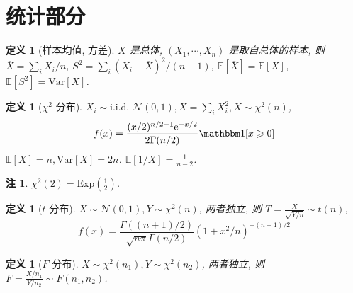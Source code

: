 \documentclass[8pt]{article}
\theoremstyle{compact}
\newtheorem{definition}[theorem]{定义}
\newtheorem{remark}[theorem]{注}
\def\ge{\geqslant}
\def\e{\mathrm{e}}
\def\E#1{\mathbb{E}\left[{#1}\right]}
\def\Var#1{\text{Var}\left[{#1}\right]}
\begin{document}
\section{统计部分}
\begin{definition}[样本均值, 方差]
	$X$ 是总体, $(X_1, \cdots, X_n)$ 是取自总体的样本, 则 $\overline{X} = \sum_i X_i / n$, $S^2 = \sum_i (X_i - \overline{X})^2 / (n - 1)$, $\E{\overline{X}} = \E{X}$, $\E{S^2} = \Var{X}$.	
\end{definition}
\begin{definition}[$\chi^2$ 分布]
	$X_i \sim \text{i.i.d. }\mathcal N(0, 1), X = \sum_i X_i^2, X \sim \chi^2(n)$, $$f(x) = \frac{(x/2)^{n/2-1}\e^{-x/2}}{2\Gamma(n/2)}\mathbbm1[x \ge 0]$$ $\E{X} = n, \Var{X} = 2n$. $\E{1 / X} = \frac{1}{n-2}$.
\end{definition}
\begin{remark}
	$\chi^2(2) = \text{Exp}\left(\frac12\right)$.
\end{remark}
\begin{definition}[$t$ 分布]
	$X \sim \mathcal N(0, 1), Y \sim \chi^2(n)$, 两者独立, 则 $T = \frac{X}{\sqrt{Y / n}} \sim t(n)$, $$f(x) = \frac{\Gamma((n+1)/2)}{\sqrt{n \pi}\Gamma(n/2)}(1 + x^2/n)^{-(n+1)/2}$$
\end{definition}
\begin{definition}[$F$ 分布]
	$X \sim \chi^2(n_1), Y \sim \chi^2(n_2)$, 两者独立, 则 $F = \frac{X / n_1}{Y / n_2} \sim F(n_1, n_2)$.
\end{definition}
\end{document}
